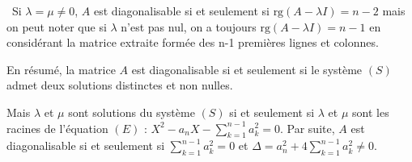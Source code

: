 {{\textbullet~Si $\lambda=\mu\neq 0$, $A$ est diagonalisable si et seulement si $\text{rg}(A-\lambda I) = n-2$ mais on peut noter que si $\lambda$ n'est pas nul, on a toujours $\text{rg}(A-\lambda I)= n-1$ en considérant la matrice extraite formée des n-1 premières lignes et colonnes.

En résumé, la matrice $A$ est diagonalisable si et seulement si le système $(S)$ admet deux solutions distinctes et non nulles.

Mais $\lambda$ et $\mu$ sont solutions du système $(S)$ si et seulement si $\lambda$ et $\mu$ sont les racines de l'équation $(E)$ : $X^2 - a_nX- \sum_{k=1}^{n-1}a_k^2 = 0$. Par suite, $A$ est diagonalisable si et seulement si $\sum_{k=1}^{n-1}a_k^2 = 0$ et $\Delta= a_n^2+4\sum_{k=1}^{n-1}a_k^2\neq0$.
}
}
